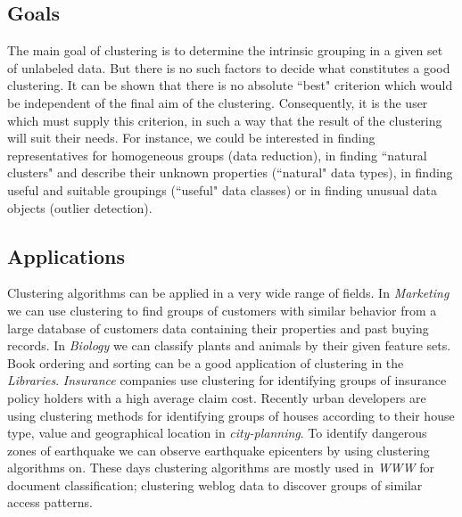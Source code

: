 \subsection{Goals}
The main goal of clustering is to determine the intrinsic grouping in a given set of unlabeled data.
But there is no such factors to decide what constitutes a good clustering. It can be shown that there is no
absolute ``best" criterion which would be independent of the final aim of the clustering. Consequently, it is the user
which must supply this criterion, in such a way that the result of the clustering will suit their needs.
For instance, we could be interested in finding representatives for homogeneous groups (data reduction),
in finding ``natural clusters" and describe their unknown properties (``natural" data types),
in finding useful and suitable groupings (``useful" data classes) or in finding unusual data objects (outlier detection).

\subsection{Applications}
Clustering algorithms can be applied in a very wide range of fields. In \textit{Marketing} we can use clustering
to find groups of customers with similar behavior from a large database of customers data containing their properties
and past buying records. In \textit{Biology} we can classify plants and animals by their given feature sets. Book
ordering and sorting can be a good application of clustering in the \textit{Libraries}. \textit{Insurance} companies
use clustering for identifying groups of insurance policy holders with a high average claim cost.
Recently urban developers are using clustering methods for identifying groups
of houses according to their house type, value and geographical location in \textit{city-planning}. To identify
dangerous zones of earthquake we can observe earthquake epicenters by using clustering algorithms on. These days
clustering algorithms are mostly used in \textit{WWW} for document classification;
clustering weblog data to discover groups of similar access patterns.

